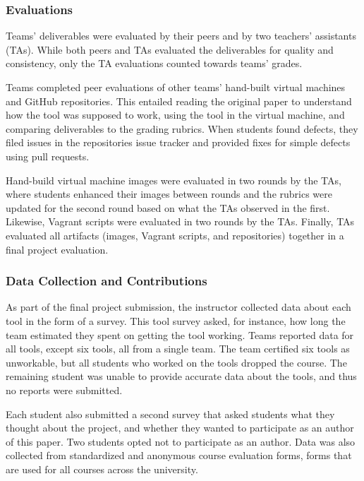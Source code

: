 \documentclass[10pt,conference]{IEEEtran}
\begin{document}
\subsubsection{Evaluations}

Teams' deliverables were evaluated by their 
peers and by two teachers' assistants (TAs).
While both peers and TAs evaluated the deliverables
for quality and consistency, only the TA evaluations
counted towards teams' grades.

Teams completed peer evaluations of other teams' hand-built 
virtual machines and GitHub repositories.
This entailed reading the original paper to understand
how the tool was supposed to work, 
using the tool in the virtual machine,
and comparing deliverables to the grading rubrics.
When students found defects, they filed issues 
in the repositories issue tracker and provided
fixes for simple defects using pull requests.


Hand-build virtual machine images were evaluated in 
two rounds by the TAs, where students enhanced their
images between rounds and the rubrics were updated
for the second round based on what the TAs 
observed in the first.
Likewise, Vagrant scripts were evaluated in two rounds
by the TAs.
Finally, TAs evaluated all artifacts (images, Vagrant 
scripts, and repositories) together in a final project 
evaluation.

\subsubsection{Data Collection and Contributions}

As part of the final project submission, 
the instructor collected data about 
each tool in the form of a survey.
This tool survey asked, for instance, how long
the team estimated they spent on getting 
the tool working.
Teams reported data for all tools, except six tools,
all from a single team.
The team certified six tools as unworkable,
but all students who worked on the tools dropped
the course.
The remaining student was unable 
to provide accurate data about the tools, and thus 
no reports were submitted.

Each student also submitted a second survey that
asked students what they thought about the project,
and whether they wanted to participate as an
author of this paper.
Two students opted not to participate as an author.
Data was also collected from standardized and 
anonymous course evaluation forms, forms
that are used for all courses 
across the university.
\end{document}
